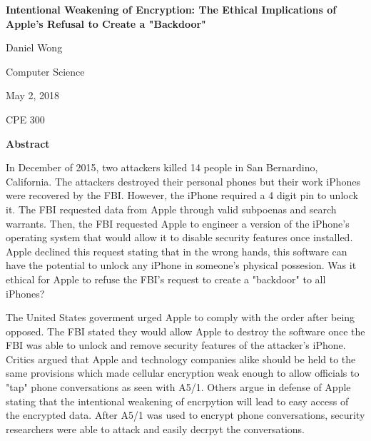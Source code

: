 \thispagestyle{plain}
\begin{titlepage}
	\begin{center}
    	\Large
    	\textbf{Intentional Weakening of Encryption: The Ethical Implications of Apple's Refusal to Create a "Backdoor"}
    
    	\vspace{0.9cm}
    	\large
    	Daniel Wong
    
    	\vspace{0.4cm}
    	Computer Science
    
    	\vspace{0.4cm}
    	May 2, 2018
    
    	\vspace{0.4cm}
    	CPE 300
    
    	\vspace{1.8cm}
    	\textbf{Abstract}
        
    	\vspace{0.4cm}
       \end{center}
{In December of 2015, two attackers killed 14 people in San Bernardino, California. The attackers destroyed their personal phones but their work iPhones were recovered by the FBI. However, the iPhone required a 4 digit pin to unlock it. The FBI requested data from Apple through valid subpoenas and search warrants. Then, the FBI requested Apple to engineer a version of the iPhone's operating system that would allow it to disable security features once installed. Apple declined this request stating that in the wrong hands, this software can have the potential to unlock any iPhone in someone's physical possesion. Was it ethical for Apple to refuse the FBI's request to create a "backdoor" to all iPhones?} \cite{apple-letter}


\par{The United States goverment urged Apple to comply with the order after being opposed. The FBI stated they would allow Apple to destroy the software once the FBI was able to unlock and remove security features of the attacker's iPhone. Critics argued that Apple and technology companies alike should be held to the same provisions which made cellular encryption weak enough to allow officials to "tap" phone conversations as seen with A5/1. Others argue in defense of Apple stating that the intentional weakening of encrpytion will lead to easy access of the encrypted data. After A5/1 was used to encrypt phone conversations, security researchers were able to attack and easily decrpyt the conversations.}
\end{titlepage}